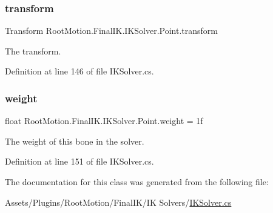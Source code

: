\subsubsection{\texorpdfstring{transform}{transform}}
{\footnotesize\ttfamily Transform Root\+Motion.\+Final\+I\+K.\+I\+K\+Solver.\+Point.\+transform}



The transform. 



Definition at line 146 of file I\+K\+Solver.\+cs.

\mbox{\label{class_root_motion_1_1_final_i_k_1_1_i_k_solver_1_1_point_a33184a0e0c8de5a15a1b0fc060f4e4fb}} 
\subsubsection{\texorpdfstring{weight}{weight}}
{\footnotesize\ttfamily float Root\+Motion.\+Final\+I\+K.\+I\+K\+Solver.\+Point.\+weight = 1f}



The weight of this bone in the solver. 



Definition at line 151 of file I\+K\+Solver.\+cs.



The documentation for this class was generated from the following file\+:\begin{DoxyCompactItemize}
\item 
Assets/\+Plugins/\+Root\+Motion/\+Final\+I\+K/\+I\+K Solvers/\mbox{\hyperlink{_i_k_solver_8cs}{I\+K\+Solver.\+cs}}\end{DoxyCompactItemize}
